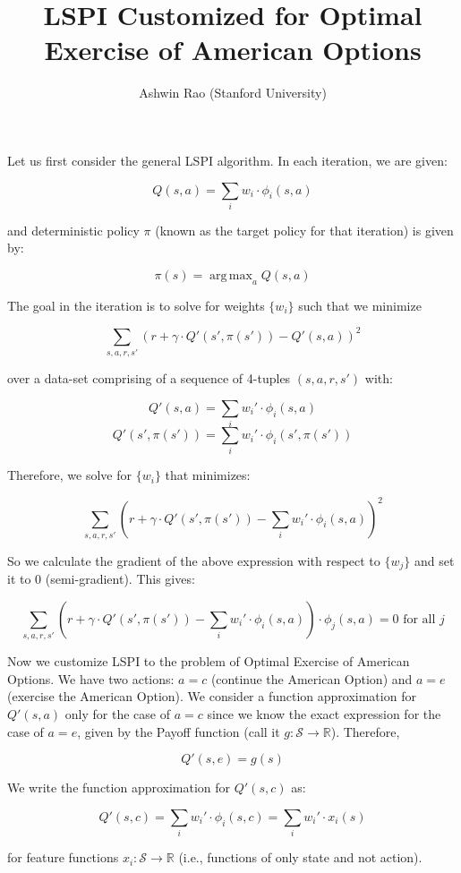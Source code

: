 \documentclass[12pt]{amsart}
\title{LSPI Customized for Optimal Exercise of American Options}
\author{Ashwin Rao (Stanford University)}
\date{} %
\DeclareMathOperator*{\argmax}{arg\,max}
\begin{document}
\maketitle

Let us first consider the general LSPI algorithm. In each iteration, we are given:

$$Q(s,a) = \sum_i w_i \cdot \phi_i(s,a)$$

and deterministic policy $\pi$ (known as the target policy for that iteration) is given by:

$$\pi(s) = \argmax_a Q(s,a)$$

The goal in the iteration is to solve for weights $\{w_i\}$ such that we minimize

$$\sum_{s,a,r,s'} (r + \gamma \cdot Q'(s',\pi(s')) - Q'(s,a))^2$$

over a data-set comprising of a sequence of 4-tuples $(s,a,r,s')$ with:

$$Q'(s,a) = \sum_i w_i' \cdot \phi_i(s,a)$$
$$Q'(s',\pi(s')) = \sum_i w_i' \cdot \phi_i(s', \pi(s'))$$

Therefore, we solve for $\{w_i\}$ that minimizes:

$$\sum_{s,a,r,s'} (r + \gamma \cdot Q'(s',\pi(s')) - \sum_i w_i' \cdot \phi_i(s,a))^2$$

So we calculate the gradient of the above expression with respect to $\{w_j\}$ and set it to 0 (semi-gradient). This gives:

\begin{equation}
\sum_{s,a,r,s'} (r + \gamma \cdot Q'(s',\pi(s')) - \sum_i w_i' \cdot \phi_i(s,a)) \cdot \phi_j(s,a) = 0 \text{ for all } j
\label{eq:general-lspi}
\end{equation}

Now we customize LSPI to the problem of Optimal Exercise of American Options. We have two actions: $a=c$ (continue the American Option) and $a=e$ (exercise the American Option). We consider a function approximation for $Q'(s,a)$ only for the case of $a=c$ since we know the exact expression for the case of $a=e$, given by the Payoff function (call it $g: \mathcal{S} \rightarrow \mathbb{R}$). Therefore,

$$Q'(s,e) = g(s)$$

We write the function approximation for $Q'(s,c)$ as:

$$Q'(s,c) = \sum_i w_i' \cdot \phi_i(s, c) = \sum_i w_i' \cdot x_i(s)$$

for feature functions $x_i: \mathcal{S} \rightarrow \mathbb{R}$ (i.e., functions of only state and not action).
\end{document}
